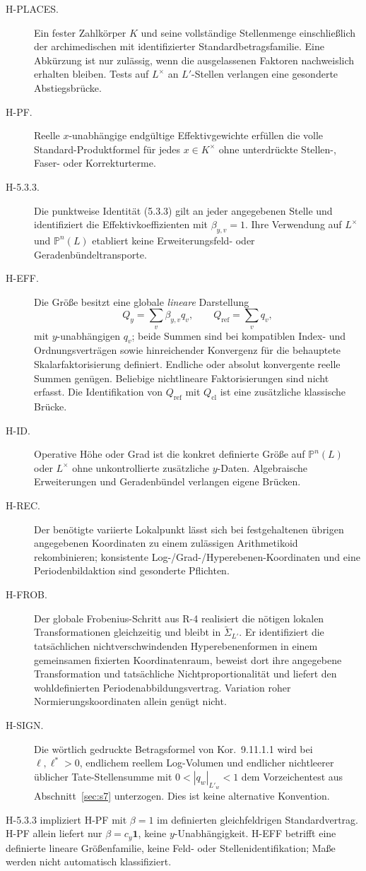 \documentclass[11pt,a4paper]{article}
\theoremstyle{definition}
\theoremstyle{remark}
\begin{document}
\begin{description}
\item[H-PLACES.] Ein fester Zahlkörper $K$ und seine vollständige
Stellenmenge einschließlich der archimedischen mit identifizierter
Standardbetragsfamilie. Eine Abkürzung ist nur zulässig, wenn die
ausgelassenen Faktoren nachweislich erhalten bleiben. Tests auf $L^\times$
an $L'$-Stellen verlangen eine gesonderte Abstiegsbrücke.
\item[H-PF.] Reelle $x$-unabhängige endgültige Effektiv\-gewichte erfüllen
die volle Standard-Produktformel für jedes $x\in K^\times$ ohne
unterdrückte Stellen-, Faser- oder Korrekturterme.
\item[H-5.3.3.] Die punktweise Identität (5.3.3) gilt an jeder angegebenen
Stelle und identifiziert die Effektivkoeffizienten mit $\beta_{y,v}=1$.
Ihre Verwendung auf $L^\times$ und $\mathbb P^n(L)$ etabliert keine
Erweiterungsfeld- oder Geradenbündeltransporte.
\item[H-EFF.] Die Größe besitzt eine globale \emph{lineare} Darstellung
\[
 Q_y=\sum_v\beta_{y,v}q_v,\qquad Q_{\mathrm{ref}}=\sum_vq_v,
\]
mit $y$-unabhängigen $q_v$; beide Summen sind bei kompatiblen Index- und
Ordnungsverträgen sowie hinreichender Konvergenz für die behauptete
Skalarfaktorisierung definiert. Endliche oder absolut konvergente reelle
Summen genügen. Beliebige nichtlineare Faktorisierungen sind nicht
erfasst. Die Identifikation von $Q_{\mathrm{ref}}$ mit $Q_{\mathrm{cl}}$
ist eine zusätzliche klassische Brücke.
\item[H-ID.] Operative Höhe oder Grad ist die konkret definierte Größe
auf $\mathbb P^n(L)$ oder $L^\times$ ohne unkontrollierte zusätzliche
$y$-Daten. Algebraische Erweiterungen und Geradenbündel verlangen eigene Brücken.
\item[H-REC.] Der benötigte variierte Lokalpunkt lässt sich bei
festgehaltenen übrigen angegebenen Koordinaten zu einem zulässigen
Arithmetikoid rekombinieren; konsistente Log-/Grad-/Hyperebenen-Koordinaten
und eine Periodenbildaktion sind gesonderte Pflichten.
\item[H-FROB.] Der globale Frobenius-Schritt aus R-4 realisiert die
nötigen lokalen Transformationen gleichzeitig und bleibt in
$\widetilde\Sigma_{L'}$. Er identifiziert die tatsächlichen
nichtverschwindenden Hyperebenenformen in einem gemeinsamen fixierten
Koordinatenraum, beweist dort ihre angegebene Transformation und
tatsächliche Nichtproportionalität und liefert den wohldefinierten
Periodenabbildungsvertrag. Variation roher Normierungskoordinaten allein
genügt nicht.
\item[H-SIGN.] Die wörtlich gedruckte Betragsformel von
Kor.~9.11.1.1 wird bei $\ell,\ell^*>0$, endlichem reellem Log-Volumen
und endlicher nichtleerer üblicher Tate-Stellensumme mit
$0<|q_w|_{L'_w}<1$ dem Vorzeichentest aus Abschnitt~\ref{sec:s7}
unterzogen. Dies ist keine alternative Konvention.
\end{description}
H-5.3.3 impliziert H-PF mit $\beta=1$ im definierten gleichfeldrigen
Standardvertrag. H-PF allein liefert nur $\beta=c_y\mathbf1$, keine
$y$-Unabhängigkeit. H-EFF betrifft eine definierte lineare Größenfamilie,
keine Feld- oder Stellenidentifikation; Maße werden nicht automatisch
klassifiziert.
\end{document}
